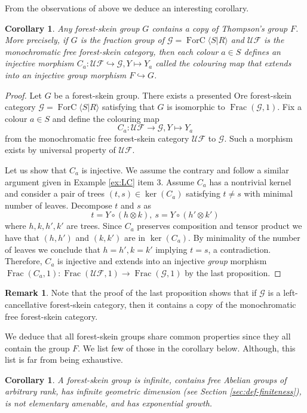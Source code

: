 \documentclass[a4paper, 12pt]{amsart}
\numberwithin{equation}{section}
\newtheorem{corollary}[theorem]{Corollary}
\theoremstyle{definition}
\newtheorem{remark}[theorem]{Remark}
\DeclareMathOperator{\Frac}{Frac}
\DeclareMathOperator{\FC}{ForC}
\newcommand{\cG}{\mathcal G}
\newcommand{\into}{\hookrightarrow}
\newcommand{\la}{\langle}
\newcommand{\ot}{\otimes}
\newcommand{\ra}{\rangle}
\newcommand{\cUF}{\mathcal{UF}}
\begin{document}
From the observations of above we deduce an interesting corollary. 

\begin{corollary}\label{cor:Finside}
Any forest-skein group $G$ contains a copy of Thompson's group $F$.
More precisely, if $G$ is the fraction group of $\cG=\FC\la S|R\ra$ and $\cUF$ is the monochromatic free forest-skein category, then each colour $a\in S$ defines an injective morphism $C_a:\cUF\into\cG,Y\mapsto Y_a$ called the colouring map that extends into an injective group morphism $F\into G$.
\end{corollary}

\begin{proof}
Let $G$ be a forest-skein group. 
There exists a presented Ore forest-skein category $\cG=\FC\langle S|R\rangle$ satisfying that $G$ is isomorphic to $\Frac(\cG,1)$. 
Fix a colour $a\in S$ and define the colouring map
$$C_a:\cUF\to\cG, Y\mapsto Y_a$$
from the monochromatic free forest-skein category $\cUF$ to $\cG$.
Such a morphism exists by universal property of $\cUF$.

Let us show that $C_a$ is injective. We assume the contrary and follow a similar argument given in Example \ref{ex:LC} item 3.
Assume $C_a$ has a nontrivial kernel and consider a pair of trees $(t,s)\in\ker(C_a)$ satisfying $t\neq s$ with minimal number of leaves.
Decompose $t$ and $s$ as $$t=Y \circ (h\ot k),\ s= Y \circ (h'\ot k')$$
where $h,k,h',k'$ are trees.
Since $C_a$ preserves composition and tensor product we have that $(h,h')$ and $(k,k')$ are in $\ker(C_a)$.
By minimality of the number of leaves we conclude that $h=h', k=k'$ implying $t=s$, a contradiction.
Therefore, $C_a$ is injective and extends into an injective {\it group} morphism $\Frac(C_a,1): \Frac(\cUF,1)\to \Frac(\cG,1)$ by the last proposition.
\end{proof}

\begin{remark}
Note that the proof of the last proposition shows that if $\cG$ is a left-cancellative forest-skein category, then it contains a copy of the monochromatic free forest-skein category.
\end{remark}

We deduce that all forest-skein groups share common properties since they all contain the group $F$. We list few of those in the corollary below. Although, this list is far from being exhaustive.

\begin{corollary}\label{cor:geometric-dimension}
A forest-skein group is infinite, contains free Abelian groups of arbitrary rank, has infinite geometric dimension (see Section \ref{sec:def-finiteness}), is not elementary amenable, and has exponential growth.
\end{corollary}
\end{document}

